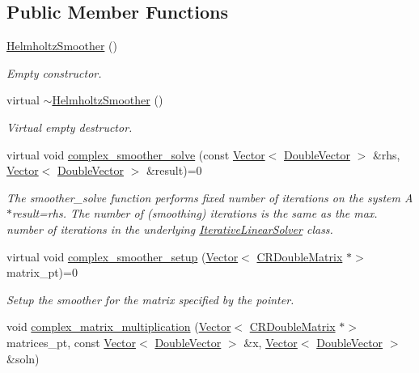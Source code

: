 \subsection*{Public Member Functions}
\begin{DoxyCompactItemize}
\item 
\hyperlink{classoomph_1_1HelmholtzSmoother_a7d220faf3d4834550ed0bc42f077c303}{Helmholtz\+Smoother} ()
\begin{DoxyCompactList}\small\item\em Empty constructor. \end{DoxyCompactList}\item 
virtual \hyperlink{classoomph_1_1HelmholtzSmoother_ac83116186f1a5beffab8faa299b8d4f1}{$\sim$\+Helmholtz\+Smoother} ()
\begin{DoxyCompactList}\small\item\em Virtual empty destructor. \end{DoxyCompactList}\item 
virtual void \hyperlink{classoomph_1_1HelmholtzSmoother_a8ec748270df3e1199f19ef267d5b8e85}{complex\+\_\+smoother\+\_\+solve} (const \hyperlink{classoomph_1_1Vector}{Vector}$<$ \hyperlink{classoomph_1_1DoubleVector}{Double\+Vector} $>$ \&rhs, \hyperlink{classoomph_1_1Vector}{Vector}$<$ \hyperlink{classoomph_1_1DoubleVector}{Double\+Vector} $>$ \&result)=0
\begin{DoxyCompactList}\small\item\em The smoother\+\_\+solve function performs fixed number of iterations on the system A$\ast$result=rhs. The number of (smoothing) iterations is the same as the max. number of iterations in the underlying \hyperlink{classoomph_1_1IterativeLinearSolver}{Iterative\+Linear\+Solver} class. \end{DoxyCompactList}\item 
virtual void \hyperlink{classoomph_1_1HelmholtzSmoother_a7fffc8d9a93fa5ca0a3e21c972ea3c05}{complex\+\_\+smoother\+\_\+setup} (\hyperlink{classoomph_1_1Vector}{Vector}$<$ \hyperlink{classoomph_1_1CRDoubleMatrix}{C\+R\+Double\+Matrix} $\ast$$>$ matrix\+\_\+pt)=0
\begin{DoxyCompactList}\small\item\em Setup the smoother for the matrix specified by the pointer. \end{DoxyCompactList}\item 
void \hyperlink{classoomph_1_1HelmholtzSmoother_a1c37bee4dbcfcc0933a18df8515783c8}{complex\+\_\+matrix\+\_\+multiplication} (\hyperlink{classoomph_1_1Vector}{Vector}$<$ \hyperlink{classoomph_1_1CRDoubleMatrix}{C\+R\+Double\+Matrix} $\ast$$>$ matrices\+\_\+pt, const \hyperlink{classoomph_1_1Vector}{Vector}$<$ \hyperlink{classoomph_1_1DoubleVector}{Double\+Vector} $>$ \&x, \hyperlink{classoomph_1_1Vector}{Vector}$<$ \hyperlink{classoomph_1_1DoubleVector}{Double\+Vector} $>$ \&soln)

\end{DoxyCompactItemize}
